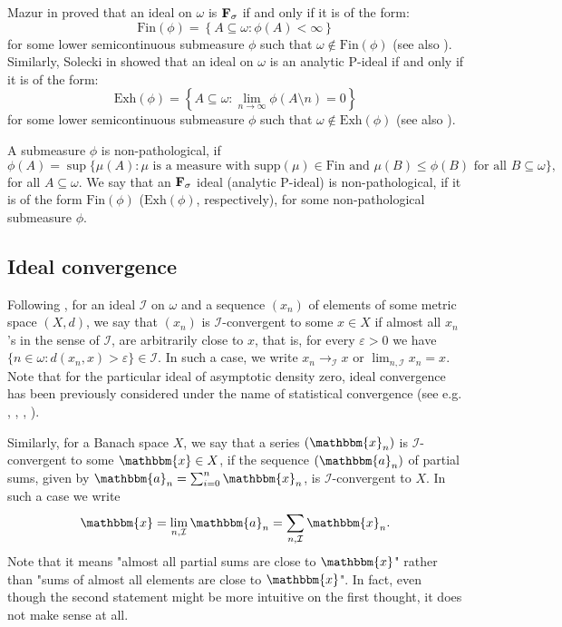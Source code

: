 \documentclass{amsart}
\newcommand{\I}{\mathcal{I}}
\newcommand{\Fin}{\mathrm{Fin}}
\newcommand{\Exh}{\mathrm{Exh}}
\newcommand{\supp}{\mathrm{supp}}
\newcommand{\w}{\mathbbm}
\begin{document}
Mazur in \cite[Lemma 1.2]{Mazur} proved that an ideal on $\omega$ is $\bf{F_\sigma}$ if and only if it is of the form:
$$\Fin(\phi)=\left\{A\subseteq\omega: \phi(A)<\infty\right\}$$
for some lower semicontinuous submeasure $\phi$ such that $\omega\notin\Fin(\phi)$ (see also \cite[Theorem 1.2.5]{Farah}). Similarly, Solecki in \cite[Theorem 3.1]{SoleckiExh} showed that an ideal on $\omega$ is an analytic P-ideal if and only if it is of the form:
$$\Exh(\phi)=\left\{A\subseteq\omega: \lim_{n\to\infty}\phi(A\setminus n)=0\right\}$$
for some lower semicontinuous submeasure $\phi$ such that $\omega\notin\Exh(\phi)$ (see also \cite[Theorem 1.2.5]{Farah}). 

A submeasure $\phi$ is non-pathological, if
$$\phi(A)=\sup\{\mu(A): \mu\text{ is a measure with }\supp(\mu)\in\Fin\text{ and }\mu(B)\leq\phi(B)\text{ for all }B\subseteq\omega\},$$
for all $A\subseteq\omega$. We say that an $\bf{F_\sigma}$ ideal (analytic P-ideal) is non-pathological, if it is of the form $\Fin(\phi)$ ($\Exh(\phi)$, respectively), for some non-pathological submeasure $\phi$.

\subsection{Ideal convergence}

Following \cite{KSW}, for an ideal $\I$ on $\omega$ and a sequence $(x_n)$ of elements of some metric space $(X,d)$, we say that $(x_n)$ is $\I$-convergent to some $x\in X$ if almost all $x_n$'s in the sense of $\I$, are arbitrarily close to $x$, that is, for every $\varepsilon>0$ we have $\{n \in \omega: d(x_n , x)> \varepsilon \} \in \I$. In such a case, we write $x_n \to_\I x$ or $\lim_{n,\I}x_n=x$. Note that for the particular ideal of asymptotic density zero, ideal convergence has been previously considered under the name of statistical convergence (see e.g. \cite{Fast}, \cite{Fridy}, \cite{Salat}, \cite{Steinhaus}).

Similarly, for a Banach space $X$, we say that a series $(\w{x}_n)$ is $\I$-convergent to some $\w{x}\in X$, if the sequence $(\w{a}_n)$ of partial sums, given by $\w{a}_n = \sum_{i=0}^n \w{x}_n$, is $\I$-convergent to $X$. In such a case we write 
\[
\w{x}=\lim_{n,\I} \w{a}_n = \sum_{n,\I} \w{x}_n.
\]
Note that it means "almost all partial sums are close to $\w{x}$" rather than "sums of almost all elements are close to $\w{x}$". In fact, even though the second statement might be more intuitive on the first thought, it does not make sense at all. 
\end{document}

